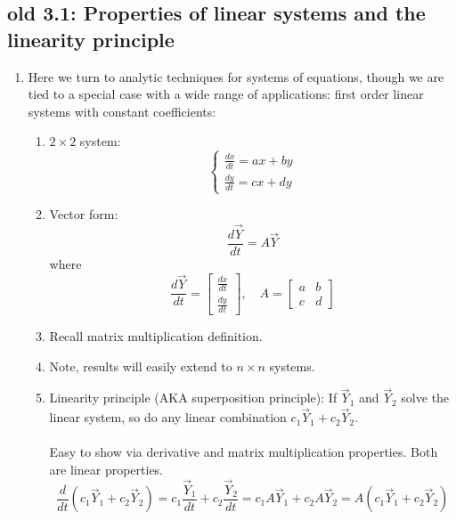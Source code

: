 \documentclass{article}
\begin{document}
\subsection{old 3.1: Properties of linear systems and the linearity principle}

\begin{enumerate}

\item Here we turn to analytic techniques for systems of equations, though we are tied to a special case with a wide range of applications: first order linear systems with constant coefficients:
\begin{enumerate}
\item $2\times 2$ system:
\[
\begin{cases}
\frac{dx}{dt} = ax+by \\
\frac{dy}{dt} = cx+dy 
\end{cases}
\]
\item Vector form:
\[
\frac{d\vec{Y}}{dt} = A \vec{Y}
\]
where 
\[
\frac{d\vec{Y}}{dt} = 
  \begin{bmatrix}
    \frac{dx}{dt} \\
    \frac{dy}{dt}
  \end{bmatrix}
, \quad
A=
  \begin{bmatrix}
    a & b \\
    c & d 
  \end{bmatrix}
\]
\item Recall matrix multiplication definition.
\item Note, results will easily extend to $n \times n$ systems.
\item Linearity principle (AKA superposition principle): If $\vec{Y}_1$ and $\vec{Y}_2$ solve the linear system, so do any linear combination $c_1\vec{Y}_1+c_2\vec{Y}_2$. \\ \ \\
Easy to show via derivative and matrix multiplication properties. Both are linear properties.
\[
\frac{d}{dt}(c_1\vec{Y}_1+c_2\vec{Y}_2) = c_1\frac{\vec{Y}_1}{dt}+c_2\frac{\vec{Y}_2}{dt} = c_1 A \vec{Y}_1 +  c_2 A \vec{Y}_2
= A ( c_1 \vec{Y}_1+ c_2 \vec{Y}_2)
\]
\end{enumerate}


\end{enumerate}
\end{document}
